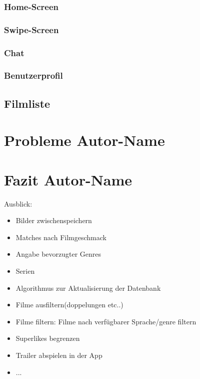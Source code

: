 \documentclass[11pt,a4paper]{article}
\begin{document}
\subsubsection{Home-Screen}
\label{sec:homescreen}

\subsubsection{Swipe-Screen}
\label{sec:swipescreen}

\subsubsection{Chat}
\label{sec:UI-Chat}

\subsubsection{Benutzerprofil}
\label{sec:benutzerprofil}

\subsection{Filmliste}
\clearpage

\section[Probleme]{Probleme \hfill \normalfont \small{Autor-Name}}
\clearpage

\section[Fazit]{Fazit \hfill \normalfont \small{Autor-Name}}

Ausblick:
\begin{itemize}
\item Bilder zwischenspeichern
\item Matches nach Filmgeschmack 
\item Angabe bevorzugter Genres
\item Serien
\item Algorithmus zur Aktualisierung der Datenbank
\item Filme ausfiltern(doppelungen etc..)
\item Filme filtern: Filme nach verfügbarer Sprache/genre filtern
\item Superlikes begrenzen
\item Trailer abspielen in der App
\item ...
\end{itemize}
\clearpage
\end{document}
